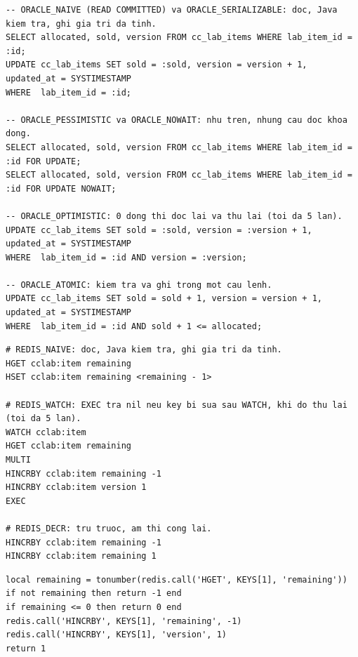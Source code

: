\reportblockspace{72pt}
\begin{lstlisting}[language=OracleSQL, caption={Các chiến lược trên Oracle (bảng cc\_lab\_items, một dòng)}, label={lst:cc-lab-oracle}]
-- ORACLE_NAIVE (READ COMMITTED) va ORACLE_SERIALIZABLE: doc, Java kiem tra, ghi gia tri da tinh.
SELECT allocated, sold, version FROM cc_lab_items WHERE lab_item_id = :id;
UPDATE cc_lab_items SET sold = :sold, version = version + 1, updated_at = SYSTIMESTAMP
WHERE  lab_item_id = :id;

-- ORACLE_PESSIMISTIC va ORACLE_NOWAIT: nhu tren, nhung cau doc khoa dong.
SELECT allocated, sold, version FROM cc_lab_items WHERE lab_item_id = :id FOR UPDATE;
SELECT allocated, sold, version FROM cc_lab_items WHERE lab_item_id = :id FOR UPDATE NOWAIT;

-- ORACLE_OPTIMISTIC: 0 dong thi doc lai va thu lai (toi da 5 lan).
UPDATE cc_lab_items SET sold = :sold, version = :version + 1, updated_at = SYSTIMESTAMP
WHERE  lab_item_id = :id AND version = :version;

-- ORACLE_ATOMIC: kiem tra va ghi trong mot cau lenh.
UPDATE cc_lab_items SET sold = sold + 1, version = version + 1, updated_at = SYSTIMESTAMP
WHERE  lab_item_id = :id AND sold + 1 <= allocated;
\end{lstlisting}

\reportblockspace{72pt}
\begin{lstlisting}[language=Redis, caption={Các chiến lược trên Redis (HASH cclab:item)}, label={lst:cc-lab-redis}]
# REDIS_NAIVE: doc, Java kiem tra, ghi gia tri da tinh.
HGET cclab:item remaining
HSET cclab:item remaining <remaining - 1>

# REDIS_WATCH: EXEC tra nil neu key bi sua sau WATCH, khi do thu lai (toi da 5 lan).
WATCH cclab:item
HGET cclab:item remaining
MULTI
HINCRBY cclab:item remaining -1
HINCRBY cclab:item version 1
EXEC

# REDIS_DECR: tru truoc, am thi cong lai.
HINCRBY cclab:item remaining -1
HINCRBY cclab:item remaining 1
\end{lstlisting}

\reportblockspace{72pt}
\begin{lstlisting}[language={[5.3]Lua}, caption={REDIS\_LUA: lab-buy.lua}, label={lst:cc-lab-lua}]
local remaining = tonumber(redis.call('HGET', KEYS[1], 'remaining'))
if not remaining then return -1 end
if remaining <= 0 then return 0 end
redis.call('HINCRBY', KEYS[1], 'remaining', -1)
redis.call('HINCRBY', KEYS[1], 'version', 1)
return 1
\end{lstlisting}

